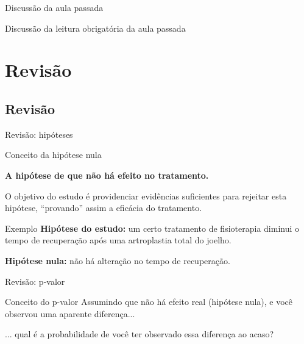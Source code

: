 \documentclass{beamer}
\begin{document}

\begin{frame}{\scriptsize Discussão da aula passada}
  \begin{block}{}
    Discussão da leitura obrigatória da aula passada
  \end{block}
\end{frame}

\section{Revisão}

\subsection{Revisão}

\begin{frame}{\scriptsize Revisão: hipóteses}
  \begin{block}{Conceito da hipótese nula}
    \begin{center}
      {\bf A hipótese de que não há efeito no tratamento.}
    \end{center}

    \bigskip
    \small
    O objetivo do estudo é providenciar evidências suficientes para rejeitar esta hipótese, ``provando'' assim a eficácia do tratamento.
  \end{block}
  \begin{exampleblock}{Exemplo}
    \footnotesize
    {\bf Hipótese do estudo:} um certo tratamento de fisioterapia diminui o tempo de recuperação após uma artroplastia total do joelho.

    \bigskip
    {\bf Hipótese nula:} não há alteração no tempo de recuperação.
  \end{exampleblock}
\end{frame}

\begin{frame}{\scriptsize Revisão: p-valor}
  \begin{block}{Conceito do p-valor}
    Assumindo que não há efeito real (hipótese nula), e você observou uma aparente diferença...

    \bigskip
    \begin{block}{}
      ... qual é a probabilidade de você ter observado essa diferença ao acaso?
    \end{block}
  \end{block}
\end{frame}
\end{document}
